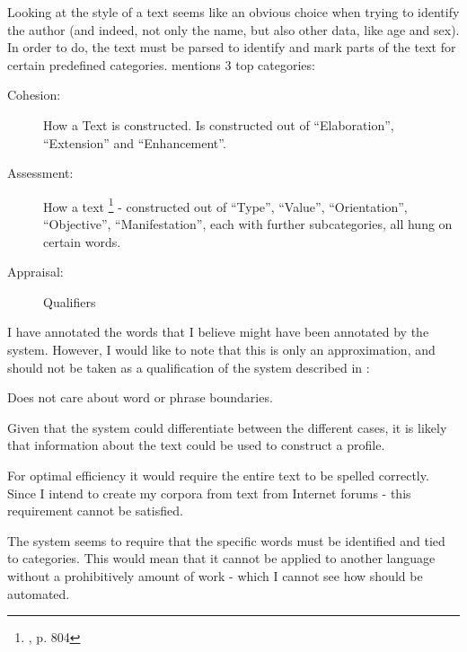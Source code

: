 {\label{stylistic}
Looking at the style of a text seems like an obvious choice when trying to identify the author (and indeed, not only the name, but also other data, like age and sex). In order to do, the text must be parsed to identify and mark parts of the text for certain predefined categories. \cite{style} mentions 3 top categories: 
\begin{description}
\item[Cohesion:] How a Text is constructed. Is constructed out of ``Elaboration'', ``Extension'' and ``Enhancement''.
\item[Assessment:] How a text \footnote{\cite{style}, p. 804} - constructed out of  ``Type'', ``Value'', ``Orientation'', ``Objective'', ``Manifestation'', each with further subcategories, all hung on certain words.
\item[Appraisal:] Qualifiers
\end{description}
}
{
I have annotated the words that I believe might have been annotated by the system. However, I would like to note that this is only an approximation, and should not be taken as a qualification of the system described in \cite{style}:\\
}  
{
\item Does not care about word or phrase boundaries.
\item Given that the system could differentiate between the different cases, it is likely that information about the text could be used to construct a profile.
}{
\item For optimal efficiency it would require the entire text to be spelled correctly. Since I intend to create my corpora from text from Internet forums - this requirement cannot be satisfied.
\item The system seems to require that the specific words must be identified and tied to categories. This would mean that it cannot be applied to another language without a prohibitively amount of work - which I cannot see how should be automated.
} 

